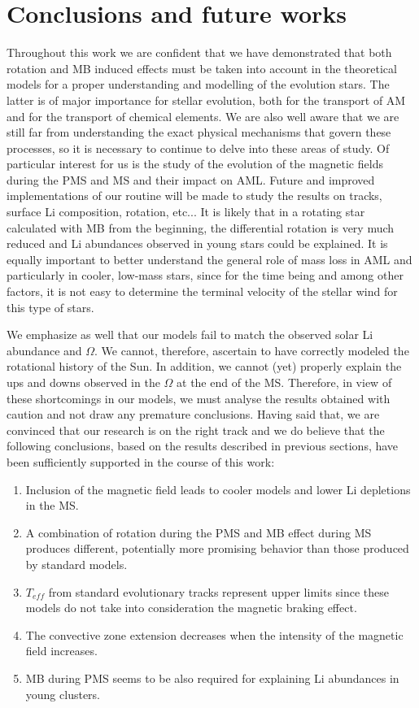 \documentclass[fleqn,usenatbib]{mnras}
\begin{document}
\section{Conclusions and future works}
Throughout this work we are confident that we have demonstrated that both rotation and MB induced effects must be taken into account in the theoretical models for a proper understanding and modelling of the evolution stars. The latter is of major importance for stellar evolution, both for the transport of AM and for the transport of chemical elements. We are also well aware that we are still far from understanding the exact physical mechanisms that govern these processes, so it is necessary to continue to delve into these areas of study. Of particular interest for us is the study of the evolution of the magnetic fields during the PMS and MS and their impact on AML. Future and improved implementations of our routine will be made to study the results on tracks, surface Li composition, rotation, etc... It is likely that in a rotating star calculated with MB from the beginning, the differential rotation is very much reduced and Li abundances observed in young stars could be explained. It is equally important to better understand the general role of mass loss in AML and particularly in cooler, low-mass stars, since for the time being and among other factors, it is not easy to determine the terminal velocity of the stellar wind for this type of stars.\par

We emphasize as well that our models fail to match the observed solar Li abundance and $\Omega$. We cannot, therefore, ascertain to have correctly modeled the rotational history of the Sun. In addition, we cannot (yet) properly explain the ups and downs observed in the $\Omega$ at the end of the MS. Therefore, in view of these shortcomings in our models, we must analyse the results obtained with caution and not draw any premature conclusions. Having said that, we are convinced that our research is on the right track and we do believe that the following conclusions, based on the results described in previous sections, have been sufficiently supported in the course of this work:
\begin{enumerate}
    \item Inclusion of the magnetic field leads to cooler models and lower Li depletions in the MS.
    \item A combination of rotation during the PMS and MB effect during MS produces different, potentially more promising behavior than those produced by standard models.
    \item $T_{eff}$ from standard evolutionary tracks represent upper limits since these models do not take into consideration the magnetic braking effect.
    \item The convective zone extension decreases when the intensity of the magnetic field increases.
    \item MB during PMS seems to be also required for explaining Li abundances in young clusters.
\end{enumerate}
\end{document}
